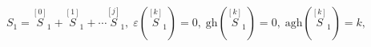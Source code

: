 \begin{equation}
S_{1}=\stackrel{[0]}{S}_{1}+\stackrel{[1]}{S}_{1}+\cdots \stackrel{[j]}{S}%
_{1},\;\varepsilon \left( \stackrel{[k]}{S}_{1}\right) =0,\;\mathrm{gh}%
\left( \stackrel{[k]}{S}_{1}\right) =0,\;\mathrm{agh}\left( \stackrel{[k]}{S}%
_{1}\right) =k,  \label{bf55}
\end{equation}

